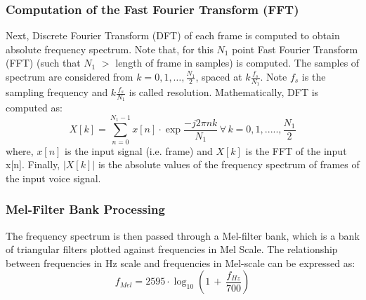 \documentclass{article}
\begin{document}
{\subsubsection{{Computation of the Fast Fourier Transform (FFT)}} Next, Discrete Fourier Transform (DFT) of each frame is computed to obtain absolute frequency spectrum. Note that, for this $N_1$ point Fast Fourier Transform (FFT) (such that $N_1$ $>$ length of frame in samples) is computed. The samples of spectrum are considered from $k = 0,1,\dots,$$\frac{N_1}{2}$, spaced at $k\frac{f_s}{N_1}$. Note $f_s$ is the sampling frequency and $k\frac{f_s}{N_1}$ is called resolution. Mathematically, DFT is computed as:
\begin{equation}
{X[k]} = \sum\limits_{n=0}^{N_1-1}{x[n]\cdot \exp{\frac{-j2\pi nk}{N_1}}}\,\forall\, {k}=0,1,.....,{\frac{N_1}{2}}
\end{equation}
where, ${x[n]}$ is the input signal (i.e. frame) and ${X[k]}$ is the FFT of the input x[n]. Finally, ${|X[k]|}$ is the absolute values of the frequency spectrum of frames of the input voice signal.
\subsubsection{{Mel-Filter Bank Processing}} The frequency spectrum is then passed through a Mel-filter bank, which is a bank of triangular filters plotted against frequencies in Mel Scale. The relationship between frequencies in Hz scale and frequencies in Mel-scale can be expressed as:
\begin{equation}
{f}_{Mel} = 2595\cdot\log_{10}{\left(1\,+\,\frac{{f}_{Hz}}{700}\right)}
\end{equation} 

}
\end{document}
